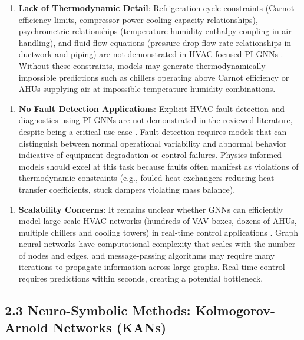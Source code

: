 \documentclass[12pt,a4paper]{article}
\begin{document}
\begin{enumerate}
  \item \textbf{Lack of Thermodynamic Detail}: Refrigeration cycle constraints (Carnot efficiency limits, compressor power-cooling capacity relationships), psychrometric relationships (temperature-humidity-enthalpy coupling in air handling), and fluid flow equations (pressure drop-flow rate relationships in ductwork and piping) are not demonstrated in HVAC-focused PI-GNNs \cite{ref36}. Without these constraints, models may generate thermodynamically impossible predictions such as chillers operating above Carnot efficiency or AHUs supplying air at impossible temperature-humidity combinations.
\end{enumerate}

\begin{enumerate}
  \item \textbf{No Fault Detection Applications}: Explicit HVAC fault detection and diagnostics using PI-GNNs are not demonstrated in the reviewed literature, despite being a critical use case \cite{ref37}. Fault detection requires models that can distinguish between normal operational variability and abnormal behavior indicative of equipment degradation or control failures. Physics-informed models should excel at this task because faults often manifest as violations of thermodynamic constraints (e.g., fouled heat exchangers reducing heat transfer coefficients, stuck dampers violating mass balance).
\end{enumerate}

\begin{enumerate}
  \item \textbf{Scalability Concerns}: It remains unclear whether GNNs can efficiently model large-scale HVAC networks (hundreds of VAV boxes, dozens of AHUs, multiple chillers and cooling towers) in real-time control applications \cite{ref38}. Graph neural networks have computational complexity that scales with the number of nodes and edges, and message-passing algorithms may require many iterations to propagate information across large graphs. Real-time control requires predictions within seconds, creating a potential bottleneck.
\end{enumerate}

\subsection{2.3 Neuro-Symbolic Methods: Kolmogorov-Arnold Networks (KANs)}
\end{document}

